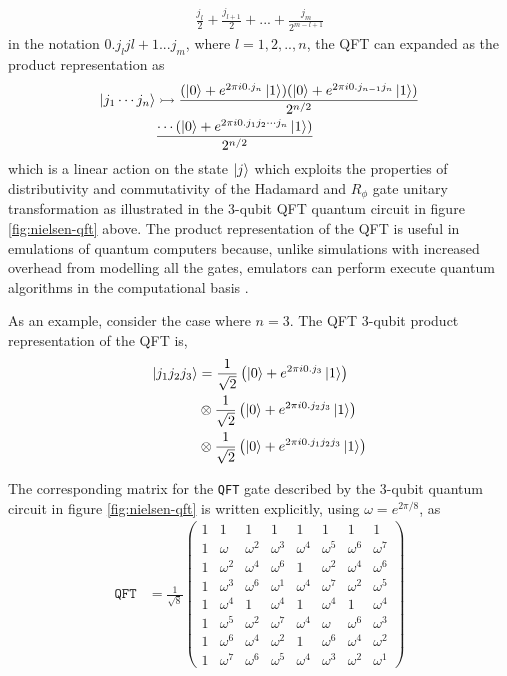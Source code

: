 \begin{align}
	\frac{j_l}{2} + \frac{j_{l+1}}{2} + ... +\frac{j_{m}}{2^{m-l+1}} \nonumber
\end{align}
in the notation $0.j_lj{l+1}...j_{m}$, where $l = 1,2,..,n$, the QFT can expanded as the product representation as
\begin{align}\label{eqn:qft-product}
	\ket{j_1\cdots j_n} & \rightarrowtail	\frac{(\ket{0} + e^{2\pi i 0.j_n}\ket{1})(\ket{0} + e^{2\pi i 0.j_{n-1}j_n}\ket{1})}{2^{n/2}} \nonumber\\
	& \frac{\cdots(\ket{0}+ e^{2\pi i 0.j_1j_2\cdots j_n}\ket{1})}{2^{n/2}}
\end{align}
which is a linear action on the state $\ket{j}$ which exploits the properties of distributivity and commutativity of the Hadamard and $R_\phi$ gate unitary transformation as illustrated in the 3-qubit QFT quantum circuit in figure \ref{fig:nielsen-qft} above. The product representation of the QFT is useful in emulations of quantum computers because, unlike simulations with increased overhead from modelling all the gates, emulators can perform execute quantum algorithms in the computational basis \cite{haner2016high}. 

As an example, consider the case where $n=3$. The QFT 3-qubit product representation of the QFT is,
\begin{align}\label{eqn:qft-3-qubit-example}
	\ket{j_1j_2j_3}	& = \frac{1}{\sqrt{2}}\left(\ket{0} + e^{2\pi i 0.j_3}\ket{1}\right)\nonumber\\
	& \otimes\frac{1}{\sqrt{2}}\left(\ket{0} + e^{2\pi i 0.j_2j_3}\ket{1}\right)\nonumber\\
	& \otimes\frac{1}{\sqrt{2}}\left(\ket{0} + e^{2\pi i 0.j_1j_2j_3}\ket{1}\right)
\end{align}
 
The corresponding matrix for the \texttt{QFT} gate described by the 3-qubit quantum circuit in figure \ref{fig:nielsen-qft} is written explicitly, using $\omega = e^{2\pi/8}$, as
\begin{align}\label{eqn:qft-matrix}
	\texttt{QFT}	& = \frac{1}{\sqrt{8}}\left(\begin{matrix}
		1 & 1 & 1 & 1 & 1 & 1 & 1 & 1\\
		1 & \omega & \omega^2	& \omega^3	& \omega^4	& \omega^5	& \omega^6	&	\omega^7\\
		1 & \omega^2 & \omega^4	& \omega^6	& 1	& \omega^2	& \omega^4	&	\omega^6\\
		1 & \omega^3 & \omega^6	& \omega^1	& \omega^4	& \omega^7	& \omega^2	&	\omega^5\\
		1 & \omega^4 & 1	& \omega^4	& 1	& \omega^4	& 1	&	\omega^4\\
		1 & \omega^5 & \omega^2	& \omega^7	& \omega^4	& \omega	& \omega^6	&	\omega^3\\
		1 & \omega^6 & \omega^4	& \omega^2	& 1	& \omega^6	& \omega^4	&	\omega^2\\
		1 & \omega^7 & \omega^6	& \omega^5	& \omega^4	& \omega^3	& \omega^2	&	\omega^1
	\end{matrix}\right)
\end{align}

